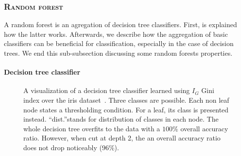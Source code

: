         \subsubsection{\textsc{Random forest}}
            \label{subsubsec::state_of_the_art::mlpr::classifiers::rf}
            A random forest is an agregation of decision tree classifiers.
            First, is explained how the latter works.
            Afterwards, we describe how the aggregation of basic classifiers can be beneficial for classification, especially in the case of decision trees.
            We end this sub-subsection discussing some random forests properties.

            \paragraph{Decision tree classifier}
                \begin{figure}[htbp]
                    \centering
                    
                    \caption[
                        A visualization of a decision tree classifier learned using $I_G$ Gini index over the iris dataset.
                    ]{
                        \label{fig::decision_tree_graph}
                        A visualization of a decision tree classifier learned using $I_G$ Gini index over the iris dataset~\parencite{fisher1936use}.
                        Three classes are possible.
                        Each non leaf node states a thresholding condition.
                        For a leaf, its class is presented instead.
                        ``dist.''stands for distribution of classes in each node.
                        The whole decision tree overfits to the data with a $100\%$ overall accuracy ratio.
                        However, when cut at depth 2, the an overall accuracy ratio does not drop noticeably ($96\%$).
                    }
                \end{figure}

